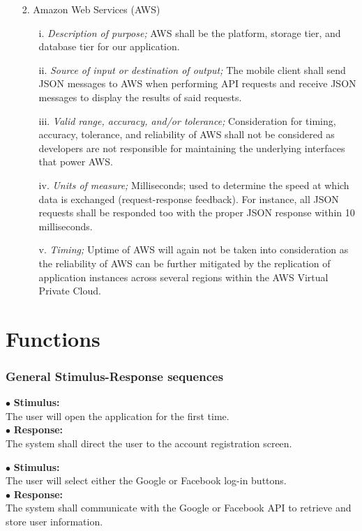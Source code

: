 \documentclass{scrreprt}
\begin{document}
\begin{enumerate}
	\item[2.] Amazon Web Services (AWS)
	\begin{itemize}
		\item[i.] \textit{Description of purpose;} AWS shall be the platform, storage tier, and database tier for our application. 
		\item[ii.] \textit{Source of input or destination of output;} The mobile client shall send JSON messages to AWS when performing API requests and receive JSON messages to display the results of said requests.
		\item[iii.] \textit{Valid range, accuracy, and/or tolerance;} Consideration for timing, accuracy, tolerance, and reliability of AWS shall not be considered as developers are not responsible for maintaining the underlying interfaces that power AWS.
		\item[iv.]  \textit{Units of measure;} Milliseconds; used to determine the speed at which data is exchanged (request-response feedback). For instance, all JSON requests shall be responded too with the proper JSON response within 10 milliseconds.
		\item[v.] \textit{Timing;} Uptime of AWS will again not be taken into consideration as the reliability of AWS can be further mitigated by the replication of application instances across several regions within the AWS Virtual Private Cloud.
	\end{itemize}
\end{enumerate}
\section{Functions}


\subsubsection{General Stimulus-Response sequences}
\vspace{4mm}
	$\bullet$ \textbf{Stimulus:} \\ \hspace{5mm} The user will open the application for the first time.\\
	$\bullet$ \textbf{Response:} \\ \hspace{5mm} The system shall direct the user to the account registration screen.

\vspace{4mm}
	\hspace{-4.75mm} $\bullet$ \textbf{Stimulus:} \\ \hspace{5mm} The user will select either the Google or Facebook log-in buttons.\\
	$\bullet$ \textbf{Response:} \\ \hspace{5mm} The system shall communicate with the Google or Facebook API to retrieve and store user information.
\end{document}

